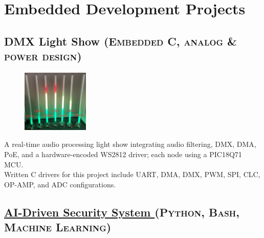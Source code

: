 \documentclass[
	10pt, %
]{FreemanCV}
\begin{document}

\vspace*{-10pt}
\section{Embedded Development Projects}
\setlength{\columnsep}{10pt}

\begin{paracol}{2} %

\vspace*{-10pt} %
\leavevmode\subsection{DMX Light Show
\hfill
\textsc{\footnotesize{(Embedded C, analog \& power design)}}}

\setlength\intextsep{-5pt} %
\begin{figure} %
	\hspace*{-5pt} %
    \includegraphics[width=90pt]{dmx} %
\end{figure}

A real-time audio processing light show integrating audio filtering, DMX, DMA, PoE, and a hardware-encoded WS2812 driver; each node using a PIC18Q71 MCU.\\ 

Written C drivers for this project include UART, DMA, DMX, PWM, SPI, CLC, OP-AMP, and ADC configurations.


\vspace*{0pt}
\leavevmode \subsection{\href{https://github.com/jfcbooth/security_system}{AI-Driven Security System \linkcolor\scriptsize\faLink}
\hfill
\textsc{\footnotesize{(Python, Bash, Machine Learning)}}}


\end{paracol}
\end{document}
